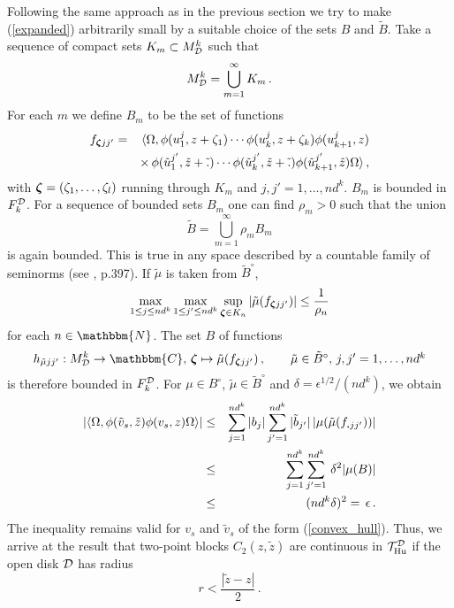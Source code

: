 \documentclass[a4paper,12pt,twoside]{article}
\renewcommand{\b}{\langle}
\renewcommand{\k}{\rangle}
\renewcommand{\v}[1]{\mbox{\boldmath $#1$}}
\renewcommand{\c}[1]{{\cal #1}}
\newcommand{\bN}{\mathbbm{N}}
\newcommand{\bC}{\mathbbm{C}}
\newcommand{\cT}{{\cal T}}
\newcommand{\eq}[1]{(\ref{#1})}
\newcommand{\D}{\c{D}}
\renewcommand{\S}{\c{S}}
\newcommand{\Hu}{{\rm Hu}}
\newcommand{\THud}{\cT_{\Hu}^{\D}}
\newcommand{\Fd}{F^{\D}_k}
\newcommand{\Md}{M^k_{\D}}
\newcommand{\Bp}{B^{\circ}}
\newcommand{\vz}{\v{\zeta}}
\newcommand{\vt}{\tilde{v}}
\newcommand{\zt}{\tilde{z}}
\newcommand{\Bt}{\tilde{B}}
\newcommand{\bt}{\tilde{b}}
\newcommand{\ut}{\tilde{u}}
\newcommand{\mut}{\tilde{\mu}}
\newcommand{\Btp}{\tilde{B}^{\circ}}
\newcommand{\dt}{\tilde{.}}
\renewcommand{\S}{\scriptstyle}
\begin{document}
Following the same approach as in the previous section we try to
make \eq{expanded} arbitrarily small by a suitable choice of the sets $B$ and $\Bt$.
Take a sequence of compact sets $K_m\subset\Md$ such that
$$\Md = \bigcup_{m=1}^\infty K_m\,.$$
For each $m$ we define $B_m$
to be the set of functions
\begin{eqnarray*}
f_{\v{\S\zeta}jj'} & = &
\b\Omega,\phi(u^j_1,z+\zeta_1)\cdots
\phi(u^j_k,z+\zeta_k)\phi(u^j_{k+1},z) \\
& &
\times\,\phi(\ut^{j'}_1,\zt+\dt)\cdots\phi(\ut^{j'}_k,\zt+\dt)\phi(\ut^{j'}_{k+1},\zt)\Omega\k\,,
\end{eqnarray*}
with
$\vz = (\zeta_1,\ldots,\zeta_l)$ running through $K_m$
and $j,j'=1,\ldots,nd^k$. $B_m$ is bounded in $\Fd$.
For a sequence of bounded sets $B_m$ one can find $\rho_m > 0$
such that the union
$$\Bt = \bigcup_{m=1}^\infty \rho_mB_m$$
is again bounded.
This is true in any space described by a countable
family of seminorms (see \cite{Koethe}, p.397).
If $\mut$ is taken from $\Btp$,
$$\max_{1\le j\le nd^k}\max_{1\le j'\le nd^k}\sup_{\v{\S\zeta}\in K_n}|\mut(f_{\v{\S\zeta}jj'})| \le \frac{1}{\rho_n}$$
for each $n\in\bN$. The set $B$ of functions
$$h_{\mut jj'}: \Md\to\bC,\,\v{\zeta}\mapsto
\mut(f_{\v{\S\zeta}jj'})\,,\qquad\mbox{$\mut\in\Btp$, $j,j'=1,\ldots,nd^k$}$$
is therefore bounded in $\Fd$. For $\mu\in\Bp$, $\mut\in\Btp$ and
$\delta = \epsilon^{1/2}/(nd^k)$,
we obtain
\begin{eqnarray*}
|\b\Omega,\phi(\vt_s,\zt)\phi(v_s,z)\Omega\k|
& \le & \sum_{j=1}^{nd^k} |b_j|\sum_{j'=1}^{nd^k}|\bt_{j'}|\,|\mu(\mut(f_{\v{\S .}jj'}))| \\
& \le & \sum_{j=1}^{nd^k}\sum_{j'=1}^{nd^k}\,\delta^2 |\mu(B)|
\\
& \le & (nd^k\delta)^2 =\,\epsilon\,.
\end{eqnarray*}
The inequality remains valid for $v_s$ and $\vt_s$ of the form
\eq{convex_hull}. Thus, we arrive at the result that
two-point blocks $C_2(z,\zt)$ are continuous in $\THud$ if
the open disk $\D$ has radius
$$r < \frac{|\zt - z|}{2}\,.$$
\end{document}
